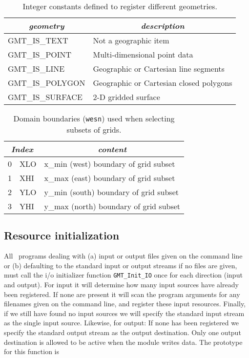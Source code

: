 \documentclass{report}
\begin{document}
\begin{table}[h]
\small
\centering
\begin{tabular}{|l|l|} \hline
\multicolumn{1}{|c|}{\emph{geometry}} & \multicolumn{1}{c|}{\emph{description}} \\ \hline
GMT\_IS\_TEXT		&       Not a geographic item \\ \hline
GMT\_IS\_POINT		&       Multi-dimensional point data \\ \hline
GMT\_IS\_LINE		&       Geographic or Cartesian line segments \\ \hline
GMT\_IS\_POLYGON	&       Geographic or Cartesian closed polygons \\ \hline
GMT\_IS\_SURFACE	&       2-D gridded surface \\ \hline
\end{tabular}
\caption{Integer constants defined to register different geometries.}
\label{tbl:geometry}
\end{table}

\begin{table}[h]
\small
\centering
\begin{tabular}{|c|l|l|} \hline
\multicolumn{2}{|c|}{\emph{Index}} & \multicolumn{1}{c|}{\emph{content}} \\ \hline
0 & XLO	&       x\_min (west) boundary of grid subset  \\ \hline
1 & XHI	&       x\_max (east) boundary of grid subset  \\ \hline
2 & YLO	&       y\_min (south) boundary of grid subset  \\ \hline
3 & YHI	&       y\_max (north) boundary of grid subset  \\ \hline
\end{tabular}
\caption{Domain boundaries (\texttt{wesn}) used when selecting subsets of grids.}
\label{tbl:wesn}
\end{table}

\subsection{Resource initialization}
All \GMT\ programs dealing with (a) input or output files given on the command line or (b) defaulting to
the standard input or output streams if no files are given, must call the i/o initializer function
\texttt{GMT\_Init\_IO} once for each direction (input and output).
For input it will determine how many input sources have already been registered.
If none are present it will scan the program arguments for any filenames given on the command line, and register
these input resources.  Finally, if we still have found no input sources we will specify the standard input stream
as the single input source.  Likewise, for output: If none has been registered we specify the standard output stream
as the output destination.  Only one output destination is allowed to be active when the module writes data.
The prototype for this function is
\end{document}
